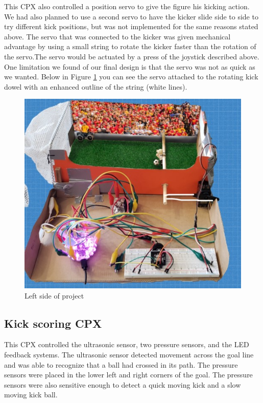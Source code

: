 \documentclass[12pt]{article}
\begin{document}
This CPX also controlled a position servo to give the figure his kicking action. We had also planned to use a second servo to have the kicker slide side to side to try different kick positions, but was not implemented for the same reasons stated above. The servo that was connected to the kicker was given mechanical advantage by using a small string to rotate the kicker faster than the rotation of the servo.The servo would be actuated by a press of the joystick described above. One limitation we found of our final design is that the servo was not as quick as we wanted. Below in Figure \ref{fig:left} you can see the servo attached to the rotating kick dowel with an enhanced outline of the string (white lines).

\begin{figure}[!t]
\centering
\includegraphics[width=4.5in]{project_left.jpg}
\caption{Left side of project}
\label{fig:left}
\end{figure}



\subsection{Kick scoring CPX}

This CPX controlled the ultrasonic sensor, two pressure sensors, and the LED feedback systems. The ultrasonic sensor detected movement across the goal line and was able to recognize that a ball had crossed in its path. The pressure sensors were placed in the lower left and right corners of the goal. The pressure sensors were also sensitive enough to detect a quick moving kick and a slow moving kick ball. 
\end{document}
